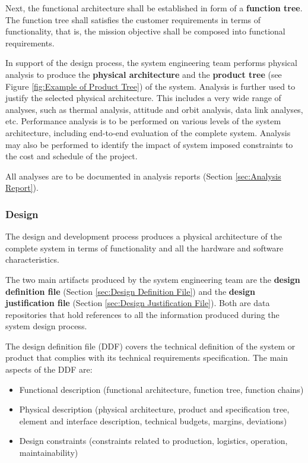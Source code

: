 Next, the functional architecture shall be established in form of a \textbf{function tree}. The function tree shall satisfies the customer requirements in terms of functionality, that is, the mission objective shall be composed into functional requirements.

In support of the design process, the system engineering team performs physical analysis to produce the \textbf{physical architecture} and the \textbf{product tree} (see Figure \ref{fig:Example of Product Tree}) of the system. Analysis is further used to justify the selected physical architecture. This includes a very wide range of analyses, such as thermal analysis, attitude and orbit analysis, data link analyses, etc. Performance analysis is to be performed on various levels of the system architecture, including end-to-end evaluation of the complete system. Analysis may also be performed to identify the impact of system imposed constraints to the cost and schedule of the project. 

All analyses are to be documented in analysis reports (Section \ref{sec:Analysis Report}).

\subsubsection{Design}

The design and development process produces a physical architecture of the complete system in terms of functionality and all the hardware and software characteristics.

The two main artifacts produced by the system engineering team are the \textbf{design definition file} (Section \ref{sec:Design Definition File}) and the \textbf{design justification file} (Section \ref{sec:Design Justification File}). Both are data repositories that hold references to all the information produced during the system design process. 

The design definition file (DDF) covers the technical definition of the system or product that complies with its technical requirements specification. The main aspects of the DDF are:

\begin{itemize}
\item Functional description (functional architecture, function tree, function chains)
\item Physical description (physical architecture, product and specification tree, element and interface description, technical budgets, margins, deviations)
\item Design constraints (constraints related to production, logistics, operation, maintainability)
\end{itemize}

